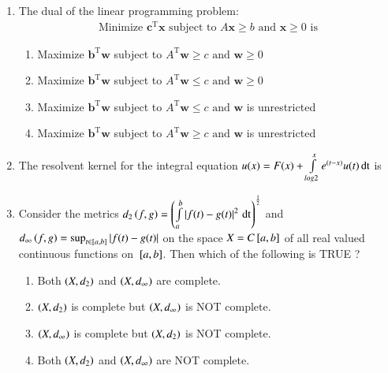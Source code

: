 \documentclass[journal]{IEEEtran}
\begin{document}
\begin{enumerate}
\item The dual of the linear programming problem:
\begin{align*}
    \text{Minimize } \textbf{c}^{\mathrm{T}}\textbf{x} \text{ subject to } A\textbf{x}\geq b \text{ and } \textbf{x} \geq 0 \text{ is}
\end{align*} 
\begin{enumerate}
    \item Maximize $\textbf{b}^{\mathrm{T}}\textbf{w}$ subject to $A^{\mathrm{T}}\textbf{w}\geq c \text{ and } \textbf{w}\geq 0$ 
    \item Maximize $\textbf{b}^{\mathrm{T}}\textbf{w}$ subject to $A^{\mathrm{T}}\textbf{w}\leq c \text{ and } \textbf{w}\geq 0$ 
    \item Maximize $\textbf{b}^{\mathrm{T}}\textbf{w}$ subject to $A^{\mathrm{T}}\textbf{w}\leq c \text{ and } \textbf{w}$ is unrestricted
    \item Maximize $\textbf{b}^{\mathrm{T}}\textbf{w}$ subject to $A^{\mathrm{T}}\textbf{w}\geq c \text{ and } \textbf{w}$ is unrestricted
\end{enumerate}

\item The resolvent kernel for the integral equation $u(x)=F(x)+\int \limits_{log 2}^x e^{\left(t-x\right)}u(t)\, \text{dt}$ is
\begin{enumerate}
\end{enumerate}

\item Consider the metrics $d_2 \left(f,g\right)=\left(\int \limits_{a}^b \left\vert f(t)-g(t)\right\vert^2\, \text{dt}\right)^\frac{1}{2}$ and $d_{\infty}\left(f,g\right)=\sup_{t \in {}\left[a,b\right]} \left\vert f(t)-g(t)\right\vert$ on the space $X=C{}\left[a,b\right]$ of all real valued continuous functions on ${}\left[a,b\right]$. Then which of the following is TRUE ?
\begin{enumerate}
    \item Both $\left(X,d_2\right)$ and $\left(X,d_{\infty}\right)$ are complete.
    \item $\left(X,d_2\right)$ is complete but $\left(X,d_{\infty}\right)$ is NOT complete.
    \item $\left(X,d_{\infty}\right)$ is complete but $\left(X,d_2\right)$ is NOT complete.
    \item Both $\left(X,d_2\right)$ and $\left(X,d_{\infty}\right)$ are NOT complete.
\end{enumerate}


\end{enumerate}
\end{document}

